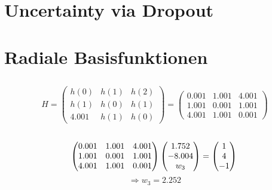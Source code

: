 \documentclass[DIN, pagenumber=false, fontsize=11pt, parskip=half]{scrartcl}
\begin{document}
    \section{Uncertainty via Dropout}
    \subsection{}
    

    \section{Radiale Basisfunktionen}
    \subsection{}
    \begin{equation*}
        H = \begin{pmatrix} h(0) & h(1) & h(2) \\ h(1) & h(0) & h(1) \\ 4.001 & h(1) & h(0) \end{pmatrix}
            = \begin{pmatrix} 0.001 & 1.001 & 4.001 \\ 1.001 & 0.001 & 1.001 \\ 4.001 & 1.001 & 0.001 \end{pmatrix}
    \end{equation*}

    \subsection{}
    \begin{equation*}
        \begin{pmatrix} 0.001 & 1.001 & 4.001 \\ 1.001 & 0.001 & 1.001 \\ 4.001 & 1.001 & 0.001 \end{pmatrix}
            \begin{pmatrix} 1.752 \\ -8.004 \\ w_3\end{pmatrix} = \begin{pmatrix} 1 \\ 4 \\ -1 \end{pmatrix} \\
    \end{equation*}
    \begin{equation*}
            \Rightarrow w_3 = 2.252
    \end{equation*}
\end{document}
